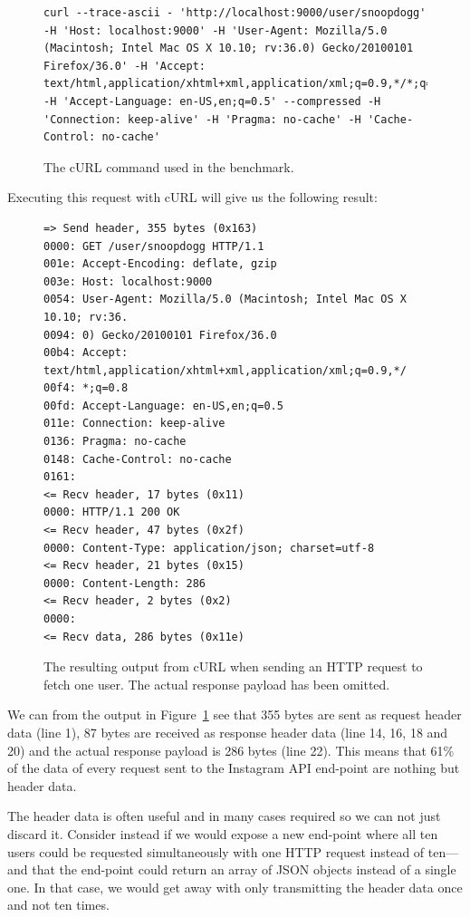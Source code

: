 \documentclass{cslthse-msc}
\begin{document}
\begin{figure}[H]
  \centering
\begin{lstlisting}[breaklines=true]
curl --trace-ascii - 'http://localhost:9000/user/snoopdogg' -H 'Host: localhost:9000' -H 'User-Agent: Mozilla/5.0 (Macintosh; Intel Mac OS X 10.10; rv:36.0) Gecko/20100101 Firefox/36.0' -H 'Accept: text/html,application/xhtml+xml,application/xml;q=0.9,*/*;q=0.8' -H 'Accept-Language: en-US,en;q=0.5' --compressed -H 'Connection: keep-alive' -H 'Pragma: no-cache' -H 'Cache-Control: no-cache'
\end{lstlisting}
  \caption{The cURL command used in the benchmark.}
\end{figure}

Executing this request with cURL will give us the following result:

\begin{figure}[H]
  \centering
\begin{lstlisting}[breaklines=true]
=> Send header, 355 bytes (0x163)
0000: GET /user/snoopdogg HTTP/1.1
001e: Accept-Encoding: deflate, gzip
003e: Host: localhost:9000
0054: User-Agent: Mozilla/5.0 (Macintosh; Intel Mac OS X 10.10; rv:36.
0094: 0) Gecko/20100101 Firefox/36.0
00b4: Accept: text/html,application/xhtml+xml,application/xml;q=0.9,*/
00f4: *;q=0.8
00fd: Accept-Language: en-US,en;q=0.5
011e: Connection: keep-alive
0136: Pragma: no-cache
0148: Cache-Control: no-cache
0161:
<= Recv header, 17 bytes (0x11)
0000: HTTP/1.1 200 OK
<= Recv header, 47 bytes (0x2f)
0000: Content-Type: application/json; charset=utf-8
<= Recv header, 21 bytes (0x15)
0000: Content-Length: 286
<= Recv header, 2 bytes (0x2)
0000:
<= Recv data, 286 bytes (0x11e)
\end{lstlisting}
  \caption{The resulting output from cURL when sending an HTTP request to fetch one user. The actual response payload has been omitted.}
  \label{fig:headers_overhead}
\end{figure}

We can from the output in Figure~\ref{fig:headers_overhead} see that 355 bytes are sent as request header data (line 1), 87 bytes are received as response header data (line 14, 16, 18 and 20) and the actual response payload is 286 bytes (line 22). This means that 61\% of the data of every request sent to the Instagram API end-point are nothing but header data.

The header data is often useful and in many cases required so we can not just discard it. Consider instead if we would expose a new end-point where all ten users could be requested simultaneously with one HTTP request instead of ten---and that the end-point could return an array of JSON objects instead of a single one. In that case, we would get away with only transmitting the header data once and not ten times.
\end{document}
